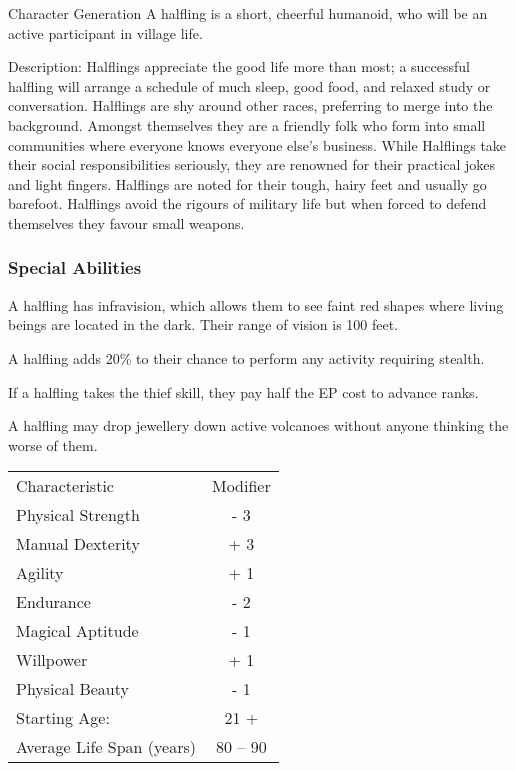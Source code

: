 \begin{Chapter}{Character Generation}
A halfling is a short, cheerful humanoid, who will be an active
participant in village life.

Description: Halflings appreciate the good life more than most; a
successful halfling will arrange a schedule of much sleep, good food,
and relaxed study or conversation.  Halflings are shy around other
races, preferring to merge into the background.  Amongst themselves
they are a friendly folk who form into small communities where
everyone knows everyone else’s business.  While Halflings take their
social responsibilities seriously, they are renowned for their
practical jokes and light fingers.  Halflings are noted for their
tough, hairy feet and usually go barefoot. Halflings avoid the rigours
of military life but when forced to defend themselves they favour
small weapons.

\subsubsection{Special Abilities}

\begin{Enumerate}

\item A halfling has infravision, which allows them to see faint red
  shapes where living beings are located in the dark. Their range of
  vision is 100 feet.

\item A halfling adds 20\% to their chance to perform any activity
  requiring stealth.

\item If a halfling takes the thief skill, they pay half the EP cost
  to advance ranks.

\item A halfling may drop jewellery down active volcanoes without
  anyone thinking the worse of them.

\end{Enumerate}

\begin{tabularx}{\columnwidth}{Xc}
Characteristic			& Modifier \\
Physical Strength		& - 3 \\
Manual Dexterity		& + 3 \\
Agility				& + 1 \\
Endurance			& - 2 \\
Magical Aptitude		& - 1 \\
Willpower			& + 1 \\
Physical Beauty			& - 1 \\
Starting Age:			& 21 + \\
Average Life Span (years)	& 80 -- 90 \\
\end{tabularx}


\end{Chapter}
